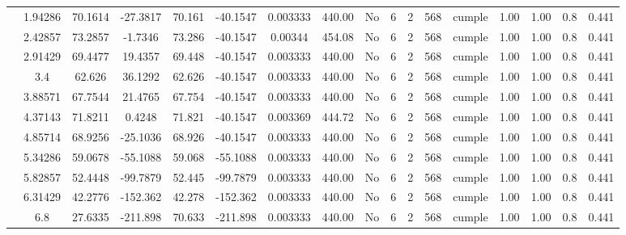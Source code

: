 \begin{table}[H]
{\begin{tabular}{|c|c|c|c|c|c|c|c|c|c|c|c|c|c|c|c|c|}
\cline{2-17}        & 1.94286 & 70.1614 & -27.3817 & 70.161 & -40.1547 & 0.003333 & 440.00 & No  & 6   & 2   & 568 & \cellcolor[rgb]{ .776,  .937,  .808}cumple & 1.00 & 1.00 & 0.8 & 0.441 \bigstrut\\
\cline{2-17}        & 2.42857 & 73.2857 & -1.7346 & 73.286 & -40.1547 & 0.00344 & 454.08 & No  & 6   & 2   & 568 & \cellcolor[rgb]{ .776,  .937,  .808}cumple & 1.00 & 1.00 & 0.8 & 0.441 \bigstrut\\
\cline{2-17}        & 2.91429 & 69.4477 & 19.4357 & 69.448 & -40.1547 & 0.003333 & 440.00 & No  & 6   & 2   & 568 & \cellcolor[rgb]{ .776,  .937,  .808}cumple & 1.00 & 1.00 & 0.8 & 0.441 \bigstrut\\
\cline{2-17}        & 3.4 & 62.626 & 36.1292 & 62.626 & -40.1547 & 0.003333 & 440.00 & No  & 6   & 2   & 568 & \cellcolor[rgb]{ .776,  .937,  .808}cumple & 1.00 & 1.00 & 0.8 & 0.441 \bigstrut\\
\cline{2-17}        & 3.88571 & 67.7544 & 21.4765 & 67.754 & -40.1547 & 0.003333 & 440.00 & No  & 6   & 2   & 568 & \cellcolor[rgb]{ .776,  .937,  .808}cumple & 1.00 & 1.00 & 0.8 & 0.441 \bigstrut\\
\cline{2-17}        & 4.37143 & 71.8211 & 0.4248 & 71.821 & -40.1547 & 0.003369 & 444.72 & No  & 6   & 2   & 568 & \cellcolor[rgb]{ .776,  .937,  .808}cumple & 1.00 & 1.00 & 0.8 & 0.441 \bigstrut\\
\cline{2-17}        & 4.85714 & 68.9256 & -25.1036 & 68.926 & -40.1547 & 0.003333 & 440.00 & No  & 6   & 2   & 568 & \cellcolor[rgb]{ .776,  .937,  .808}cumple & 1.00 & 1.00 & 0.8 & 0.441 \bigstrut\\
\cline{2-17}        & 5.34286 & 59.0678 & -55.1088 & 59.068 & -55.1088 & 0.003333 & 440.00 & No  & 6   & 2   & 568 & \cellcolor[rgb]{ .776,  .937,  .808}cumple & 1.00 & 1.00 & 0.8 & 0.441 \bigstrut\\
\cline{2-17}        & 5.82857 & 52.4448 & -99.7879 & 52.445 & -99.7879 & 0.003333 & 440.00 & No  & 6   & 2   & 568 & \cellcolor[rgb]{ .776,  .937,  .808}cumple & 1.00 & 1.00 & 0.8 & 0.441 \bigstrut\\
\cline{2-17}        & 6.31429 & 42.2776 & -152.362 & 42.278 & -152.362 & 0.003333 & 440.00 & No  & 6   & 2   & 568 & \cellcolor[rgb]{ .776,  .937,  .808}cumple & 1.00 & 1.00 & 0.8 & 0.441 \bigstrut\\
\cline{2-17}        & \cellcolor[rgb]{ .851,  .882,  .949}6.8 & 27.6335 & -211.898 & 70.633 & -211.898 & 0.003333 & 440.00 & No  & 6   & 2   & 568 & \cellcolor[rgb]{ .776,  .937,  .808}cumple & 1.00 & 1.00 & 0.8 & 0.441 \bigstrut\\

\end{tabular}}
\end{table}
